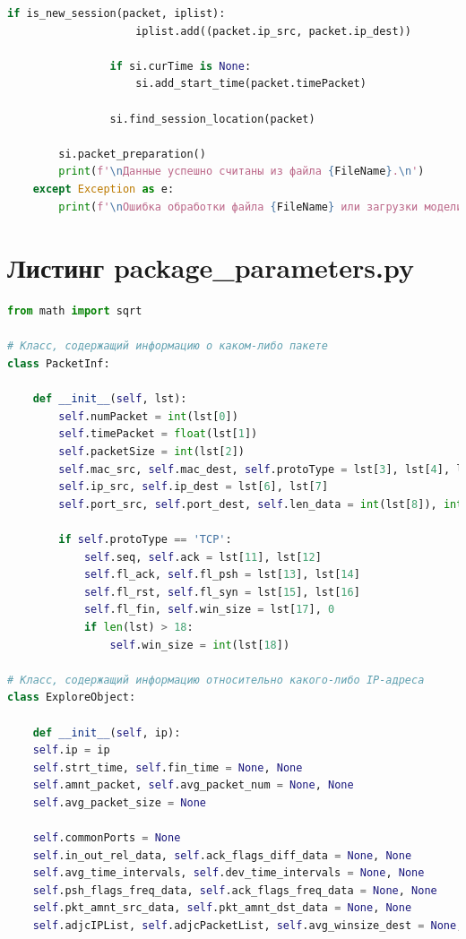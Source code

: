\documentclass[bachelor, och, coursework]{SCWorks}
\begin{document}
\begin{lstlisting}[language=Python]
                if is_new_session(packet, iplist):
                    iplist.add((packet.ip_src, packet.ip_dest))
                
                if si.curTime is None:
                    si.add_start_time(packet.timePacket)
                
                si.find_session_location(packet)
        
        si.packet_preparation()
        print(f'\nДанные успешно считаны из файла {FileName}.\n')
    except Exception as e:
        print(f'\nОшибка обработки файла {FileName} или загрузки модели: {e}\n')        
    \end{lstlisting}

    \section{Листинг package\_parameters.py}

    \begin{lstlisting}[language=Python]
from math import sqrt

# Класс, содержащий информацию о каком-либо пакете
class PacketInf:

    def __init__(self, lst):
        self.numPacket = int(lst[0])
        self.timePacket = float(lst[1])
        self.packetSize = int(lst[2])
        self.mac_src, self.mac_dest, self.protoType = lst[3], lst[4], lst[5]
        self.ip_src, self.ip_dest = lst[6], lst[7]
        self.port_src, self.port_dest, self.len_data = int(lst[8]), int(lst[9]), int(lst[10])

        if self.protoType == 'TCP':
            self.seq, self.ack = lst[11], lst[12]
            self.fl_ack, self.fl_psh = lst[13], lst[14]
            self.fl_rst, self.fl_syn = lst[15], lst[16]
            self.fl_fin, self.win_size = lst[17], 0
            if len(lst) > 18:
                self.win_size = int(lst[18])

# Класс, содержащий информацию относительно какого-либо IP-адреса
class ExploreObject:

    def __init__(self, ip):
    self.ip = ip
    self.strt_time, self.fin_time = None, None
    self.amnt_packet, self.avg_packet_num = None, None
    self.avg_packet_size = None

    self.commonPorts = None
    self.in_out_rel_data, self.ack_flags_diff_data = None, None
    self.avg_time_intervals, self.dev_time_intervals = None, None
    self.psh_flags_freq_data, self.ack_flags_freq_data = None, None
    self.pkt_amnt_src_data, self.pkt_amnt_dst_data = None, None
    self.adjcIPList, self.adjcPacketList, self.avg_winsize_dest = None, None, None
    \end{lstlisting}
\end{document}
